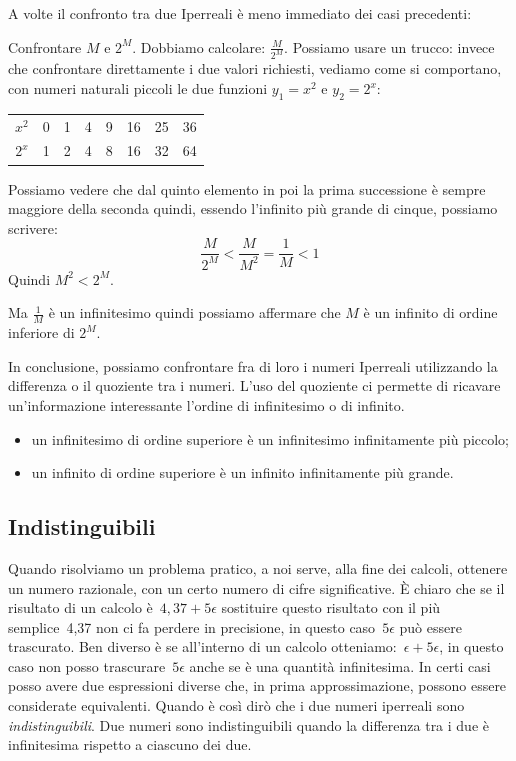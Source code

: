 \vspace{1em}
A volte il confronto tra due Iperreali è meno immediato dei casi precedenti:
\begin{esempio}
 Confrontare \(M\) e \(2^M\). 
 Dobbiamo calcolare: \(\frac{M}{2^M}\). 
Possiamo usare un trucco: invece che confrontare direttamente i due valori 
richiesti, vediamo come si comportano, con numeri naturali piccoli le due 
funzioni  
\(y_1=x^2\) e \(y_2=2^x\):
\begin{center}
\begin{tabular}{cccccccc}
$x^2$ & 0 & 1 & 4 & 9 & 16 & 25 & 36\\
$2^x$ & 1 & 2 & 4 & 8 & 16 & 32 & 64
\end{tabular}
\end{center}
Possiamo vedere che dal quinto elemento in poi la prima successione è sempre
maggiore della seconda quindi, essendo l'infinito più grande di cinque, 
possiamo scrivere:
\[\frac{M}{2^M} < \frac{M}{M^2} = \frac{1}{M} < 1\]
Quindi \(M^2 < 2^M\).

Ma \(\frac{1}{M}\) è un infinitesimo quindi possiamo affermare che $M$ è un 
infinito di ordine inferiore di $2^M$.
\end{esempio}

In conclusione, possiamo confrontare fra di loro i numeri Iperreali 
utilizzando la differenza o il quoziente tra i numeri. L'uso del quoziente 
ci permette di ricavare un'informazione interessante l'ordine di 
infinitesimo o di infinito.
\begin{itemize} [noitemsep]
 \item un infinitesimo di ordine superiore è un infinitesimo infinitamente 
 più piccolo;
 \item un infinito di ordine superiore è un infinito infinitamente più 
grande.
\end{itemize}

\subsection{Indistinguibili}
\label{subsec:insnum_indistinguibili}

Quando risolviamo un problema pratico, a noi serve, alla fine dei calcoli, 
ottenere un numero razionale, con un certo numero di cifre significative.
È chiaro che se il risultato di un calcolo è~\(4,37+5\epsilon\) sostituire 
questo risultato con il più semplice~4,37 non ci fa perdere in precisione, 
in questo caso~\(5\epsilon\) può essere trascurato.
Ben diverso è se all'interno di un calcolo  
otteniamo:~\(\epsilon+5\epsilon\), in questo caso non posso 
trascurare~\(5\epsilon\) anche se è una quantità infinitesima. 
In certi casi posso avere due espressioni diverse che, in prima 
approssimazione, possono essere considerate equivalenti. Quando è così dirò 
che i due numeri iperreali sono \emph{indistinguibili}.
Due numeri sono indistinguibili quando la differenza tra i due è 
infinitesima rispetto a ciascuno dei due.

